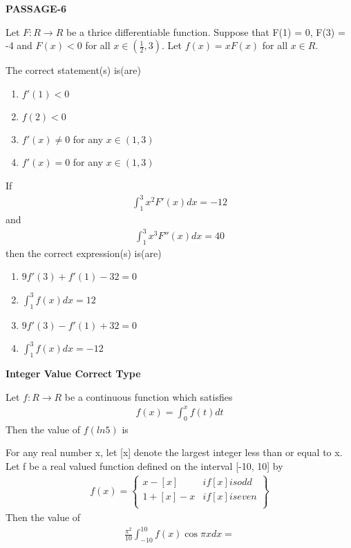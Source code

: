 \textbf{PASSAGE-6}

Let $F: R \to R$ be a thrice differentiable function. Suppose that F(1) = 0, F(3) = -4 and $F(x) < 0$ for all $x \in \left(\frac{1}{2}, 3\right)$. Let $f(x) = xF(x)$ for all $x \in R$.

\item The correct statement(s) is(are)
\begin{enumerate}
\item $f'(1) < 0$
\item $f(2) < 0$
\item $f'(x) \neq 0$ for any $x \in (1, 3)$
\item $f'(x) = 0$ for any $x \in (1, 3)$
\end{enumerate}

\item If 
\begin{align*}
\int_{1}^{3}x^2F'(x)dx = -12
\end{align*}
and
\begin{align*}
\int_{1}^{3}x^3F''(x)dx = 40
\end{align*}
then the correct expression(s) is(are)
\begin{enumerate}
\item $9f'(3) + f'(1) - 32 = 0$
\item $\int_{1}^{3}f(x)dx = 12$
\item $9f'(3) - f'(1) + 32 = 0$
\item $\int_{1}^{3}f(x)dx = -12$
\end{enumerate}

\textbf{Integer Value Correct Type}

\item Let $f: R \to R$ be a continuous function which satisfies
\begin{align*}
f(x) = \int_{0}^{x}f(t)dt
\end{align*}
Then the value of $f(ln 5)$ is

\item For any real number x, let [x] denote the largest integer less than or equal to x. Let f be a real valued function defined on the interval [-10, 10] by
\begin{align*}
f(x) = 
\left\lbrace
\begin{array}{ll}
      x - [x] & if [x] is odd\\
      1 + [x] - x & if [x] is even\\
\end{array}
\right\rbrace
\end{align*}
Then the value of 
\begin{align*}
\frac{\pi^{2}}{10}\int_{-10}^{10}f(x)\cos \pi x dx = 
\end{align*}

